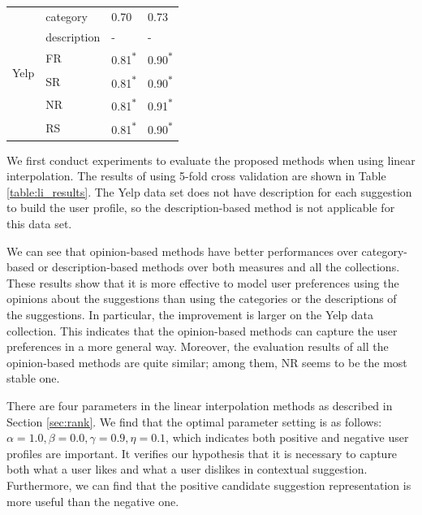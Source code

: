 \begin{table}[t]
\begin{tabular}{ |c|l|l|l| }
\multirow{6}{*}{Yelp} & category & 0.70 & 0.73 \\
 & description & - & - \\  \cline{2-4}
 & FR & 0.81\textsuperscript{$\ast$} & 0.90\textsuperscript{$\ast$} \\
 & SR & 0.81\textsuperscript{$\ast$} & 0.90\textsuperscript{$\ast$} \\
 & NR & 0.81\textsuperscript{$\ast$} & 0.91\textsuperscript{$\ast$} \\
 & RS & 0.81\textsuperscript{$\ast$} & 0.90\textsuperscript{$\ast$} \\

\hline
\end{tabular}
\end{table}

We first conduct experiments to evaluate the proposed methods when using 
linear interpolation. The results of using 5-fold
cross validation are shown in Table \ref{table:li_results}. 
The Yelp data set does not have description for each suggestion to 
build the user profile, so the description-based method is not applicable 
for this data set.

We can see that opinion-based methods have better performances over 
category-based or description-based methods over both measures and all 
the collections. These results show that it is more effective
to model user preferences using the opinions about the suggestions than 
using the categories or the descriptions of the suggestions. 
In particular, the improvement is larger on the Yelp data collection. 
This indicates that the opinion-based methods can capture the user 
preferences in a more general way. Moreover, the evaluation results of 
all the opinion-based methods are quite similar; 
among them, NR seems to be the most stable one.


There are four parameters in the linear interpolation methods as described in
Section \ref{sec:rank}. We find that the optimal parameter setting is
as follows: $\alpha=1.0,\beta=0.0,\gamma=0.9,\eta=0.1$, 
which indicates both positive and negative user profiles are important. 
It verifies our hypothesis that it is necessary to capture both what a 
user likes and what a user dislikes in contextual suggestion.  
Furthermore, we can find that the positive candidate suggestion 
representation is more useful than the negative one. 


